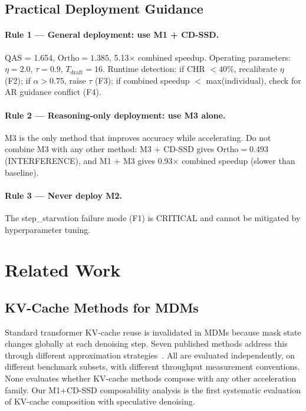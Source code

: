 \documentclass{article}
\newcommand{\ortho}{\text{Ortho}}
\newcommand{\Tdraft}{T_{\text{draft}}}
\begin{document}
\subsection{Practical Deployment Guidance}
\label{sec:deployment}

\paragraph{Rule 1 --- General deployment: use M1 + CD-SSD.} QAS = 1.654, $\ortho = 1.385$,
5.13$\times$ combined speedup. Operating parameters: $\eta = 2.0$, $\tau = 0.9$, $\Tdraft = 16$.
Runtime detection: if CHR $< 40\%$, recalibrate $\eta$ (F2); if $\alpha > 0.75$, raise $\tau$ (F3);
if combined speedup $<$ max(individual), check for AR guidance conflict (F4).

\paragraph{Rule 2 --- Reasoning-only deployment: use M3 alone.} M3 is the only method that improves
accuracy while accelerating. Do not combine M3 with any other method: M3 + CD-SSD gives $\ortho =
0.493$ (INTERFERENCE), and M1 + M3 gives 0.93$\times$ combined speedup (slower than baseline).

\paragraph{Rule 3 --- Never deploy M2.} The step\_starvation failure mode (F1) is CRITICAL and
cannot be mitigated by hyperparameter tuning.

\section{Related Work}
\label{sec:related}

\subsection{KV-Cache Methods for MDMs}

Standard transformer KV-cache reuse is invalidated in MDMs because mask state changes globally at
each denoising step. Seven published methods address this through different approximation
strategies~\cite{fastdllm,dkvcache,elasticcache,entropycache,flashdlm,windowdiffusion,slowfast}.
All are evaluated independently, on different benchmark subsets, with different throughput
measurement conventions. None evaluates whether KV-cache methods compose with any other acceleration
family. Our M1+CD-SSD composability analysis is the first systematic evaluation of KV-cache
composition with speculative denoising.
\end{document}
